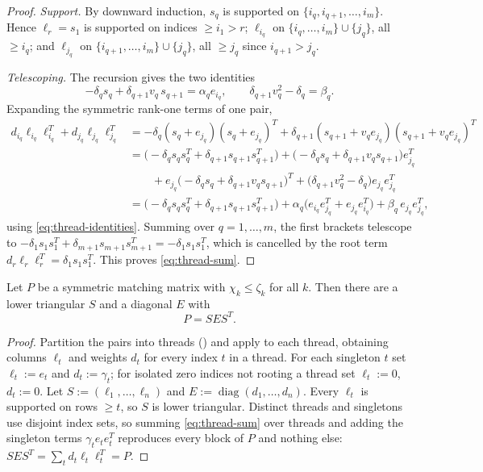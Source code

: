 \begin{proof}
  \emph{Support.}  By downward induction, $s_q$ is supported on
  $\{i_q, i_{q+1}, \ldots, i_m\}$.  Hence $\ell_r = s_1$ is supported on
  indices $\ge i_1 > r$; $\ell_{i_q}$ on
  $\{i_q, \ldots, i_m\} \cup \{j_q\}$, all $\ge i_q$; and $\ell_{j_q}$ on
  $\{i_{q+1}, \ldots, i_m\} \cup \{j_q\}$, all $\ge j_q$ since
  $i_{q+1} > j_q$.

  \emph{Telescoping.}  The recursion gives the two identities
  \begin{equation}\label{eq:thread-identities}
    -\delta_q s_q + \delta_{q+1} v_q \, s_{q+1} = \alpha_q e_{i_q},
    \qquad
    \delta_{q+1} v_q^2 - \delta_q = \beta_q .
  \end{equation}
  Expanding the symmetric rank-one terms of one pair,
  \begin{align*}
    d_{i_q} \ell_{i_q} \ell_{i_q}^T + d_{j_q} \ell_{j_q} \ell_{j_q}^T
    &= -\delta_q (s_q + e_{j_q})(s_q + e_{j_q})^T
    + \delta_{q+1} (s_{q+1} + v_q e_{j_q})(s_{q+1} + v_q e_{j_q})^T \\
    &= \bigl( -\delta_q s_q s_q^T + \delta_{q+1} s_{q+1} s_{q+1}^T \bigr)
    + \bigl( -\delta_q s_q + \delta_{q+1} v_q s_{q+1} \bigr) e_{j_q}^T \\
    &\qquad
    + e_{j_q} \bigl( -\delta_q s_q + \delta_{q+1} v_q s_{q+1} \bigr)^T
    + \bigl( \delta_{q+1} v_q^2 - \delta_q \bigr) e_{j_q} e_{j_q}^T \\
    &= \bigl( -\delta_q s_q s_q^T + \delta_{q+1} s_{q+1} s_{q+1}^T \bigr)
    + \alpha_q \bigl( e_{i_q} e_{j_q}^T + e_{j_q} e_{i_q}^T \bigr)
    + \beta_q \, e_{j_q} e_{j_q}^T,
  \end{align*}
  using \cref{eq:thread-identities}.  Summing over $q = 1, \ldots, m$, the
  first brackets telescope to
  $-\delta_1 s_1 s_1^T + \delta_{m+1} s_{m+1} s_{m+1}^T
  = -\delta_1 s_1 s_1^T$, which is cancelled by the root term
  $d_r \ell_r \ell_r^T = \delta_1 s_1 s_1^T$.  This proves
  \cref{eq:thread-sum}.
\end{proof}

\begin{theorem}\label{thm:ldlt-matching}
  Let $P$ be a symmetric matching matrix with $\chi_k \le \zeta_k$ for all
  $k$.  Then there are a lower triangular $S$ and a diagonal $E$ with
  \[
    P = S E S^T .
  \]
\end{theorem}

\begin{proof}
  Partition the pairs into threads () and apply
   to each thread, obtaining columns
  $\ell_t$ and weights $d_t$ for every index $t$ in a thread.  For each
  singleton $t$ set $\ell_t := e_t$ and $d_t := \gamma_t$; for isolated
  zero indices not rooting a thread set $\ell_t := 0$, $d_t := 0$.  Let
  $S := (\ell_1, \ldots, \ell_n)$ and $E := \operatorname{diag}(d_1,
  \ldots, d_n)$.  Every $\ell_t$ is supported on rows $\ge t$, so $S$ is
  lower triangular.  Distinct threads and singletons use disjoint index
  sets, so summing \cref{eq:thread-sum} over threads and adding the
  singleton terms $\gamma_t e_t e_t^T$ reproduces every block of $P$ and
  nothing else:
  $S E S^T = \sum_t d_t \ell_t \ell_t^T = P$.
\end{proof}

